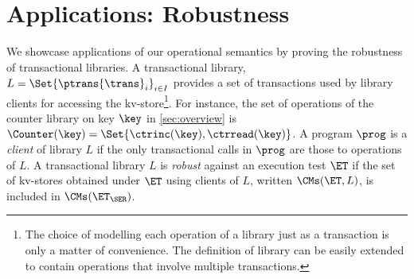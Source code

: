 \section{Applications: Robustness}
\label{sec:applications}
\label{sec:program-analysis}

We showcase applications of our operational semantics by proving the
robustness of transactional libraries.
A transactional library, $L =
\Set{\ptrans{\trans}_{i}}_{i \in I}$
provides  a set of transactions  used by  library clients for accessing  the
kv-store\footnote{The choice of modelling each operation of a library
  just  as a transaction is only a 
matter of convenience. The definition of library can be easily extended to contain operations that involve multiple transactions.}. 
For instance, the set of operations of the counter library on key $\key$ in \cref{sec:overview} is $\Counter(\key) = \Set{\ctrinc(\key), \ctrread(\key)}$.
A program $\prog$ is a \emph{client} of library $L$ if  the only transactional calls in $\prog$ are those to operations of $L$.  
A transactional library $L$ is \emph{robust} against an execution test
$\ET$ if the set of kv-stores obtained under $\ET$ using 
clients of  $L$, written $\CMs(\ET, L)$, is included in
$\CMs(\ET_{\SER})$. 

